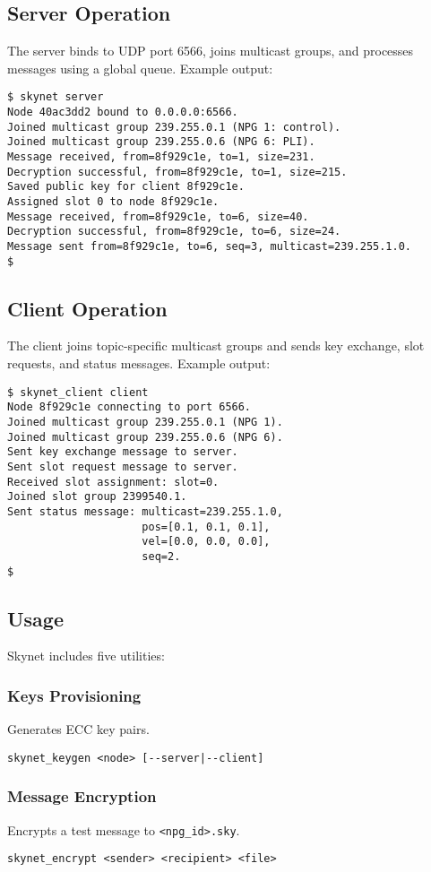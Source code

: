 \documentclass{article}
\begin{document}
\subsection{Server Operation}
The server binds to UDP port 6566, joins multicast groups, and processes messages using a global
queue. Example output:
\begin{lstlisting}
$ skynet server
Node 40ac3dd2 bound to 0.0.0.0:6566.
Joined multicast group 239.255.0.1 (NPG 1: control).
Joined multicast group 239.255.0.6 (NPG 6: PLI).
Message received, from=8f929c1e, to=1, size=231.
Decryption successful, from=8f929c1e, to=1, size=215.
Saved public key for client 8f929c1e.
Assigned slot 0 to node 8f929c1e.
Message received, from=8f929c1e, to=6, size=40.
Decryption successful, from=8f929c1e, to=6, size=24.
Message sent from=8f929c1e, to=6, seq=3, multicast=239.255.1.0.
$
\end{lstlisting}

\subsection{Client Operation}
The client joins topic-specific multicast groups and sends key exchange, slot requests, and status
messages. Example output:
\begin{lstlisting}
$ skynet_client client
Node 8f929c1e connecting to port 6566.
Joined multicast group 239.255.0.1 (NPG 1).
Joined multicast group 239.255.0.6 (NPG 6).
Sent key exchange message to server.
Sent slot request message to server.
Received slot assignment: slot=0.
Joined slot group 2399540.1.
Sent status message: multicast=239.255.1.0,
                     pos=[0.1, 0.1, 0.1],
                     vel=[0.0, 0.0, 0.0],
                     seq=2.
$
\end{lstlisting}

\newpage
\subsection{Usage}
Skynet includes five utilities:

\subsubsection*{Keys Provisioning}
Generates ECC key pairs.
\begin{lstlisting}
skynet_keygen <node> [--server|--client]
\end{lstlisting}

\subsubsection*{Message Encryption}
Encrypts a test message to \texttt{<npg\_id>.sky}.
\begin{lstlisting}
skynet_encrypt <sender> <recipient> <file>
\end{lstlisting}
\end{document}
